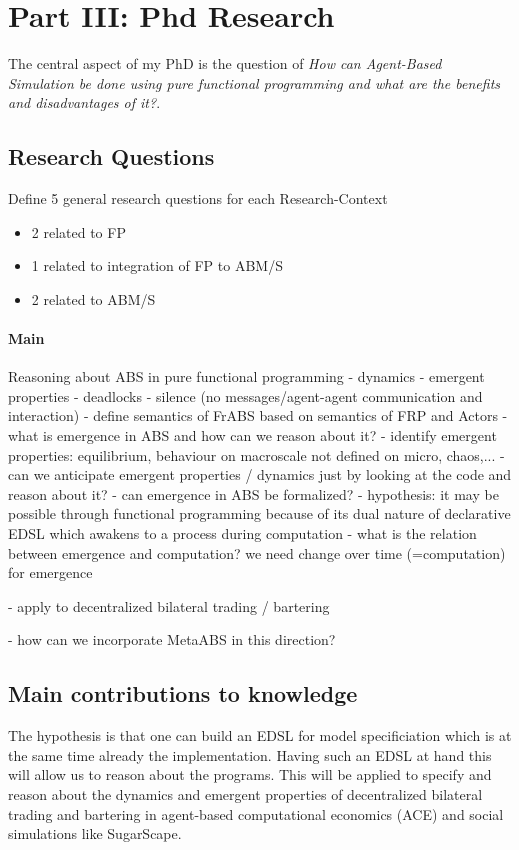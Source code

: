 \section{Part III: Phd Research} 
The central aspect of my PhD is the question of \textit{How can Agent-Based Simulation be done using pure functional programming and what are the benefits and disadvantages of it?}.

\subsection{Research Questions}

Define 5 general research questions for each Research-Context
	\begin{itemize}
    \item 2 related to FP
    \item 1 related to integration of FP to ABM/S
    \item 2 related to ABM/S
    \end{itemize}


\paragraph{Main}
Reasoning about ABS in pure functional programming
	- dynamics
	- emergent properties
	- deadlocks
	- silence (no messages/agent-agent communication and interaction)
	- define semantics of FrABS based on semantics of FRP and Actors
	- what is emergence in ABS and how can we reason about it? 
		- identify emergent properties: equilibrium, behaviour on macroscale not defined on micro, chaos,...
		- can we anticipate emergent properties / dynamics just by looking at the code and reason about it?
		- can emergence in ABS be formalized?
			- hypothesis: it may be possible through functional programming because of its dual nature of declarative EDSL which awakens to a process during computation
				- what is the relation between emergence and computation? we need change over time (=computation) for emergence
				
	- apply to decentralized bilateral trading / bartering
	
- how can we incorporate MetaABS in this direction?

\subsection{Main contributions to knowledge}
The hypothesis is that one can build an EDSL for model specificiation which is at the same time already the implementation. Having such an EDSL at hand this will allow us to reason about the programs. This will be applied to specify and reason about the dynamics and emergent properties of decentralized bilateral trading and bartering in agent-based computational economics (ACE) and social simulations like SugarScape.

